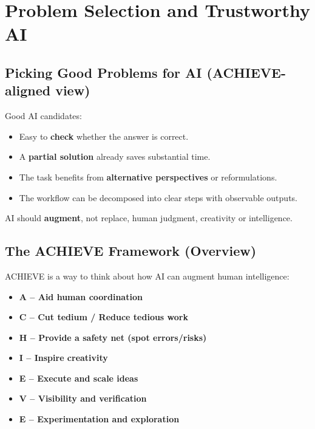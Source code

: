 \documentclass[
  letterpaper,
  DIV=11,
  numbers=noendperiod]{scrreprt}
\providecommand{\tightlist}{%
  \setlength{\itemsep}{0pt}\setlength{\parskip}{0pt}}
\begin{document}
\section{Problem Selection and Trustworthy
AI}\label{problem-selection-and-trustworthy-ai}

\subsection{Picking Good Problems for AI (ACHIEVE-aligned
view)}\label{picking-good-problems-for-ai-achieve-aligned-view}

Good AI candidates:

\begin{itemize}
\tightlist
\item
  Easy to \textbf{check} whether the answer is correct.
\item
  A \textbf{partial solution} already saves substantial time.
\item
  The task benefits from \textbf{alternative perspectives} or
  reformulations.
\item
  The workflow can be decomposed into clear steps with observable
  outputs.
\end{itemize}

AI should \textbf{augment}, not replace, human judgment, creativity or
intelligence.

\subsection{The ACHIEVE Framework
(Overview)}\label{the-achieve-framework-overview}

ACHIEVE is a way to think about how AI can augment human intelligence:

\begin{itemize}
\tightlist
\item
  \textbf{A -- Aid human coordination}
\item
  \textbf{C -- Cut tedium / Reduce tedious work}
\item
  \textbf{H -- Provide a safety net (spot errors/risks)}
\item
  \textbf{I -- Inspire creativity}
\item
  \textbf{E -- Execute and scale ideas}
\item
  \textbf{V -- Visibility and verification}
\item
  \textbf{E -- Experimentation and exploration}
\end{itemize}
\end{document}
